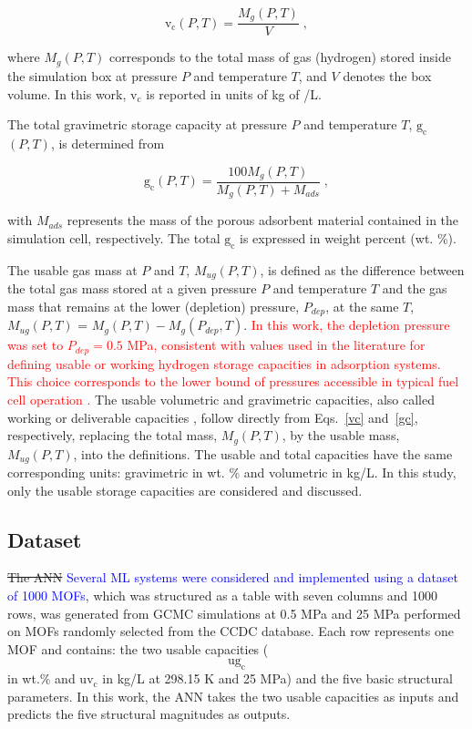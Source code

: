 \documentclass[review]{elsarticle}
\newcommand{\gc}{\mathrm{g_c}}
\newcommand{\vc}{\mathrm{v_c}}
\newcommand{\ugc}{$\mathrm{ug_c}$}
\newcommand{\uvc}{\mathrm{uv_c}}
\begin{document}
\begin{equation}
\label{vc}
\vc(P,T) = \frac{M_g(P,T)}{V} \;,
\end{equation}

\noindent
where $M_g(P,T)$ corresponds to the total mass of gas (hydrogen) stored inside the simulation box at pressure $P$ and temperature $T$, and $V$ denotes the box volume. In this work, $\vc$ is reported in units of kg of /L.

The total gravimetric storage capacity at pressure $P$ and temperature $T$, $\gc$$(P,T)$, is determined from

\begin{equation}
\label{gc}
\gc(P,T) = \frac{100 M_g(P,T)}{M_g(P,T) + M_{ads}} \;,
\end{equation}

\noindent
with $M_{ads}$ represents the mass of the porous adsorbent material contained in the simulation cell, respectively. The total $\gc$ is expressed in weight percent (wt. \%).

The usable gas mass at $P$ and $T$, $M_{ug}(P,T)$, is defined as the difference between the total gas mass stored at a given pressure $P$ and temperature $T$ and the gas mass that remains at the lower (depletion) pressure, $P_{dep}$, at the same $T$, 
$M_{ug}(P,T)$ = $M_g(P,T) - M_g(P_{dep},T)$. 
\textcolor{red}{In this work, the depletion pressure was set to $P_{dep} = 0.5$ MPa, consistent with values used in the literature for defining usable or working hydrogen storage capacities in adsorption systems. This choice corresponds to the lower bound of pressures accessible in typical fuel cell operation \cite{cltgv21,rscf22}.}
The usable volumetric and gravimetric capacities, also called working or deliverable capacities \cite{doe25,ahg+18,sh16}, follow directly from Eqs.~\ref{vc} and~\ref{gc}, respectively, replacing the total mass, $M_g(P,T)$, by the usable mass, $M_{ug}(P,T)$, into the definitions. The usable and 
total capacities have the same corresponding units: gravimetric in wt. \% and volumetric in kg/L. In this study, only the usable storage capacities are considered and discussed.

\subsection{Dataset}

\sout{The ANN} \textcolor{blue}{Several ML systems were considered and implemented using a dataset of 1000 MOFs}, which was structured as a table with seven columns and 1000 rows, was generated from GCMC simulations at 0.5 MPa and 25 MPa performed on MOFs randomly selected from the CCDC database. Each row represents one MOF and contains: the two usable capacities ($\ugc$ in wt.\% and $\uvc$ in kg/L at 298.15 K and 25 MPa) and the five basic structural parameters. In this work, the ANN takes the two usable capacities as inputs and predicts the five structural magnitudes as outputs.
\end{document}
